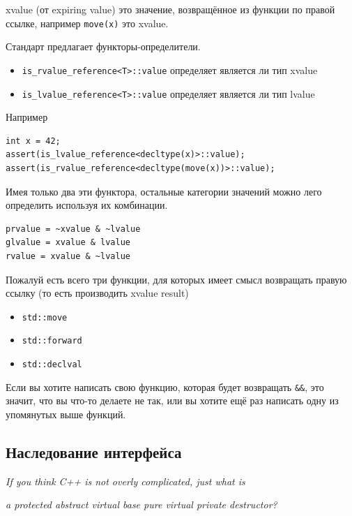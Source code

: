 \documentclass[a4paper,12pt,oneside]{article}
\begin{document}
xvalue (от expiring value) это значение, возвращённое из функции по правой ссылке, например \lstinline!move(x)! это xvalue.

Стандарт предлагает функторы-определители.

\begin{itemize}
\item \lstinline!is_rvalue_reference<T>::value! определяет является ли  тип xvalue
\item \lstinline!is_lvalue_reference<T>::value! определяет является ли тип lvalue
\end{itemize}

Например

\begin{lstlisting}
int x = 42;
assert(is_lvalue_reference<decltype(x)>::value);
assert(is_rvalue_reference<decltype(move(x))>::value);
\end{lstlisting}

Имея только два эти функтора, остальные категории значений можно лего определить используя их комбинации.

\begin{verbatim}
prvalue = ~xvalue & ~lvalue
glvalue = xvalue & lvalue
rvalue = xvalue & ~lvalue
\end{verbatim}

Пожалуй есть всего три функции, для которых имеет смысл возвращать правую ссылку (то есть производить xvalue result)

\begin{itemize}
\item \lstinline!std::move!
\item \lstinline!std::forward!
\item \lstinline!std::declval!
\end{itemize}

Если вы хотите написать свою функцию, которая будет возвращать \lstinline!&&!, это значит, что вы что-то делаете не так, или вы хотите ещё раз написать одну из упомянутых выше функций.

\pagebreak
\subsection{Наследование интерфейса}\label{IntfInheritance}

\hfill\textit{If you think C++ is not overly complicated, just what is} 

\hfill\textit{a protected abstract virtual base pure virtual private destructor?}
\end{document}
